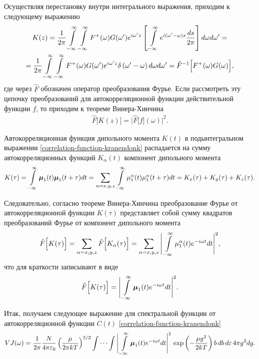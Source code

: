 Осуществляя перестановку внутри интегрального выражения, приходим к следующему выражению 
\begin{gather}
    K(z) = \frac{1}{2\pi} \int\limits_{-\infty}^\infty \int\limits_{-\infty}^\infty F^+(\omega) G(\omega^\prime) e^{i \omega^\prime z} \left[ \, \int\limits_{-\infty}^\infty e^{i (\omega^\prime - \omega) s} \frac{ds}{2 \pi} \right] d\omega d\omega^\prime = \notag \\
    = \frac{1}{2\pi} \int\limits_{-\infty}^\infty \int\limits_{-\infty}^\infty F^+(\omega) G(\omega^\prime) e^{i \omega^\prime z} \delta \left( \omega^\prime - \omega \right) d\omega d\omega^\prime = \hat{F}^{-1} \Big[ F^+(\omega) G(\omega) \Big],
\end{gather}
%
где через $\hat{F}$ обозначен оператор преобразования Фурье. Если рассмотреть эту цепочку преобразований для автокорреляционной функции действительной функции $f$, то приходим к теореме Винера-Хинчина \cite{frommhold}
\begin{gather}
    \hat{F} \Big[ K(z) \Big] = \Bigg\vert \hat{F}\Big[ f \Big](\omega) \Bigg\vert^2. 
\end{gather}

Автокорреляционная функция дипольного момента $K(t)$ в подынтегральном выражении \eqref{correlation-function-kranendonk} распадается на сумму автокорреляционных функций $K_\alpha(t)$ компонент дипольного момента 
\begin{gather}
    K(\tau) = \int\limits_{-\infty}^\infty \boldsymbol{\mu}_1(t) \boldsymbol{\mu}_1(t + \tau) dt = \sum_{\alpha = x, y, z} \int\limits_{-\infty}^\infty \mu_1^\alpha(t) \mu_1^\alpha(t + \tau) dt = K_x(\tau) + K_y(\tau) + K_z(\tau).
\end{gather}

Следовательно, согласно теореме Винера-Хинчина преобразование Фурье от автокорреляционной функции $K(\tau)$ представляет собой сумму квадратов преобразований Фурье от компонент дипольного момента 
\begin{gather}
    \hat{F}\Big[ K(\tau) \Big] = \sum_{\alpha = x,y,z} \hat{F} \Big[ K_\alpha(\tau) \Big] = \sum_{\alpha=x,y,z} \Bigg\vert \int\limits_{-\infty}^\infty \mu_1^\alpha(t) e^{-i\omega t} dt \Bigg\vert^2,
\end{gather}
% 
что для краткости записывают в виде 
\begin{gather}
    \hat{F} \Big[ K(\tau) \Big] = \Bigg\vert \int\limits_{-\infty}^\infty \boldsymbol{\mu}_1(t) e^{-i\omega t} dt \Bigg\vert^2. \label{correlation-theorem}
\end{gather}

Итак, получаем следующее выражение для спектральной функции от автокорреляционной функции $C(t)$ \eqref{correlation-function-kranendonk}  
\begin{gather}
    VJ(\omega) = \frac{1}{2 \pi} \frac{N}{4\pi \varepsilon_0} \left( \frac{\mu}{2 \pi k T} \right)^{3/2} \idotsint \Bigg\vert \int\limits_{-\infty}^\infty \boldsymbol{\mu}_1(t) e^{-i \omega t} dt \Bigg\vert^2 \, \exp \left( -\frac{\mu g^2}{2 k T} \right) b \, db \, d \varepsilon \, 4 \pi g^3 dg. \label{spectral-function-kranendonk}
\end{gather}

